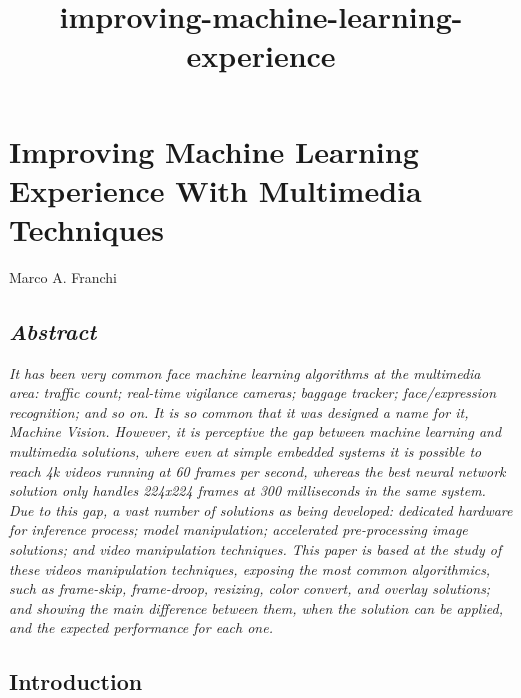 \documentclass[11pt]{article}
\title{improving-machine-learning-experience}
\begin{document}
    
    \maketitle
    
    

    
    \section{Improving Machine Learning Experience With Multimedia
Techniques}\label{improving-machine-learning-experience-with-multimedia-techniques}

Marco A. Franchi

\subsection{\texorpdfstring{\emph{Abstract}}{Abstract}}\label{abstract}

\emph{It has been very common face machine learning algorithms at the
multimedia area: traffic count; real-time vigilance cameras; baggage
tracker; face/expression recognition; and so on. It is so common that it
was designed a name for it, Machine Vision. However, it is perceptive
the gap between machine learning and multimedia solutions, where even at
simple embedded systems it is possible to reach 4k videos running at 60
frames per second, whereas the best neural network solution only handles
224x224 frames at 300 milliseconds in the same system. Due to this gap,
a vast number of solutions as being developed: dedicated hardware for
inference process; model manipulation; accelerated pre-processing image
solutions; and video manipulation techniques. This paper is based at the
study of these videos manipulation techniques, exposing the most common
algorithmics, such as frame-skip, frame-droop, resizing, color convert,
and overlay solutions; and showing the main difference between them,
when the solution can be applied, and the expected performance for each
one.}

\subsection{Introduction}\label{introduction}
\end{document}
